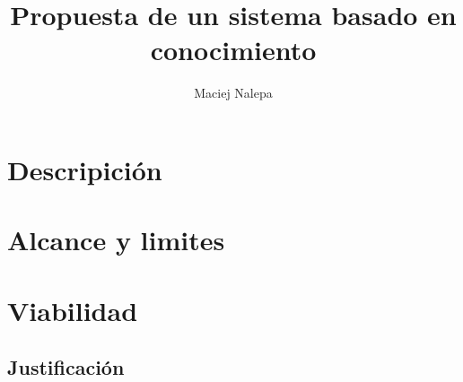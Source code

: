\documentclass[a4paper,12pt]{article}
\title{Propuesta de un sistema basado en conocimiento}
\author{Maciej Nalepa}
\begin{document}
\maketitle

\section{Descripición}

\section{Alcance y limites}

\section{Viabilidad}

\subsection{Justificación}
\end{document}
